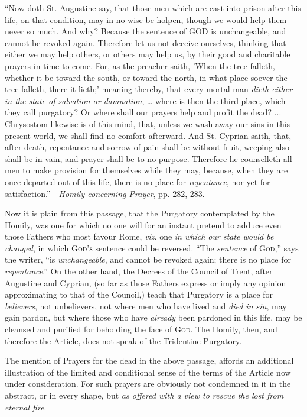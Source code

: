 ``Now doth St. Augustine say, that those men
which are cast into prison after this life, on that condition, may in
no wise be holpen, though we would help them never so much. And why?
Because the sentence of GOD
is unchangeable, and cannot be revoked again. Therefore let us not
deceive ourselves, thinking that either we may help others, or others
may help us, by their good and charitable prayers in time to come.
For, as the preacher saith, 'When the tree falleth, whether it be
toward the south, or toward the north, in what place soever the tree
falleth, there it lieth;' meaning thereby, that every mortal man \emph{dieth
either in the state of salvation or damnation}, … where is then
the third place, which they call purgatory? Or where shall our prayers
help and profit the dead? ... Chrysostom likewise is of this mind,
that, unless we wash away our sins in this present world, we shall
find no comfort afterward. And St. Cyprian saith, that, after death,
repentance and sorrow of pain shall be without fruit, weeping also
shall be in vain, and prayer shall be to no purpose. Therefore he
counselleth all men to make provision for themselves while they may,
because, when they are once departed out of this life, there is no
place for \emph{repentance}, nor yet for satisfaction.''—\emph{Homily
concerning Prayer}, pp. 282, 283.

Now it is plain from this passage, that the Purgatory contemplated
by the Homily, was one for which no one will for an instant
pretend to adduce even those Fathers who most favour Rome, \emph{viz}.
one \emph{in which our state would be changed}, in which G\textsc{od's}
sentence could be reversed. ``The \emph{sentence} of G\textsc{od},''
says the writer, ``is \emph{unchangeable}, and cannot be revoked
again; there is no place for \emph{repentance}.'' On the other
hand, the Decrees of the Council of Trent, after Augustine and
Cyprian, (so far as those Fathers express or imply any opinion
approximating to that of the Council,) teach that Purgatory is a place
for \emph{believers}, not unbelievers, not where men who have lived
and \emph{died in sin}, may gain pardon, but where those who have \emph{already}
been pardoned in this life, may be cleansed and purified for beholding
the face of G\textsc{od}. The Homily, then, and therefore
the Article, does not speak of the Tridentine Purgatory.

The mention of Prayers for the dead in the above passage, affords
an additional illustration of the limited and conditional sense of the
terms of the Article now under consideration. For such prayers are
obviously not condemned in it in the abstract, or in every shape, but \emph{as
offered with a view to rescue the lost from eternal fire}.

